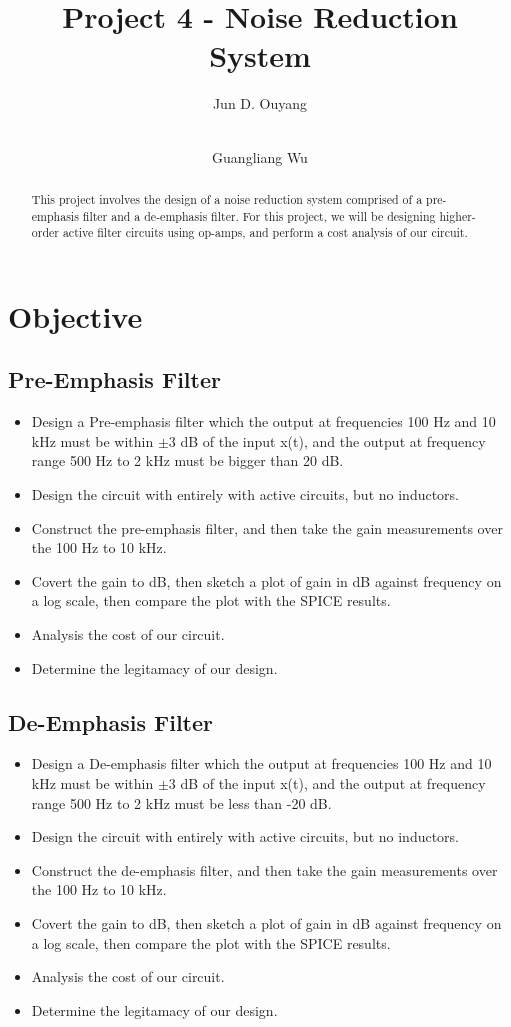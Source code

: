 \documentclass[a4paper]{IEEEtran}
\begin{document}
	
	\title{Project 4 - Noise Reduction System}
	\author{Jun D. Ouyang \and \\Guangliang Wu }
	\maketitle
	
	\begin{abstract}
		This project involves the design of a noise reduction system comprised of a pre-emphasis filter and a de-emphasis filter. For this project, we will be designing higher-order active filter circuits using op-amps, and perform a cost analysis of our circuit.
	\end{abstract}
	\section{Objective}
		\subsection{Pre-Emphasis Filter}
			\begin{itemize}
				\item{Design a Pre-emphasis filter which the output at frequencies 100 Hz and 10 kHz must be within $\pm 3$ dB of the input x(t), and the output at frequency range 500 Hz to 2 kHz must be bigger than 20 dB.}
				\item{Design the circuit with entirely with active circuits, but no inductors.}
				\item{Construct the pre-emphasis filter, and then take the gain measurements over the 100 Hz to 10 kHz. }
				\item{Covert the gain to dB, then sketch a plot of gain in dB against frequency on a log scale, then compare the plot with the SPICE results.}
				\item{Analysis the cost of our circuit.}
				\item{Determine the legitamacy of our design.}
			\end{itemize}
		\subsection{De-Emphasis Filter}
			\begin{itemize}
				\item{Design a De-emphasis filter which the output at frequencies 100 Hz and 10 kHz must be within $\pm 3$ dB of the input x(t), and the output at frequency range 500 Hz to 2 kHz must be less than -20 dB.}
				\item{Design the circuit with entirely with active circuits, but no inductors.}
				\item{Construct the de-emphasis filter, and then take the gain measurements over the 100 Hz to 10 kHz. }
				\item{Covert the gain to dB, then sketch a plot of gain in dB against frequency on a log scale, then compare the plot with the SPICE results.}
				\item{Analysis the cost of our circuit.}
				\item{Determine the legitamacy of our design.}
			\end{itemize}
\end{document}
